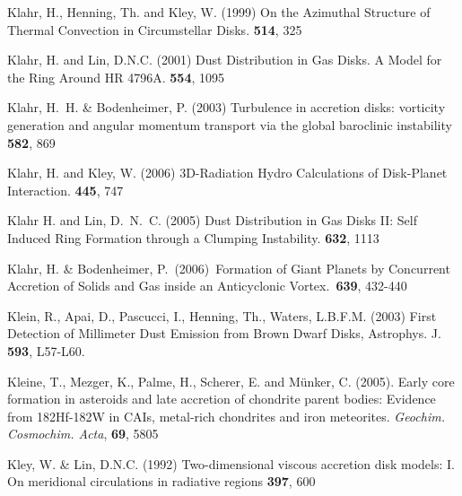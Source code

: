 \begin{literature}
\item
Klahr, H., Henning, Th. and Kley, W. (1999) On the Azimuthal Structure of
Thermal Convection in Circumstellar Disks. \apj \textbf{514}, 325

\item
Klahr, H. and Lin, D.N.C. (2001) Dust Distribution in Gas Disks. A Model for
the Ring Around HR 4796A. \apj \textbf{554}, 1095

\item
Klahr, H.~H. \& Bodenheimer, P. (2003)  Turbulence in accretion disks:
vorticity generation and angular momentum transport via the global
baroclinic instability  \apj \textbf{582}, 869

\item
Klahr, H. and Kley, W. (2006) 3D-Radiation Hydro Calculations of Disk-Planet
Interaction. \aap \textbf{445}, 747

\item
Klahr H. and Lin, D.~N.~C. (2005) Dust Distribution in Gas Disks II: Self 
Induced Ring Formation through a Clumping Instability. \apj \textbf{632},
1113

\item Klahr, H. \& Bodenheimer, P.\ (2006)\ 
Formation of Giant Planets by Concurrent Accretion of Solids and Gas inside
an Anticyclonic Vortex.\ \apj \textbf{639}, 432-440

\item 
Klein, R., Apai, D., Pascucci, I., Henning, Th., Waters,
L.B.F.M. (2003) First Detection of Millimeter Dust Emission from Brown
Dwarf Disks, Astrophys. J. \textbf{593}, L57-L60.


\item 
Kleine, T., Mezger, K., Palme, H., Scherer, E. and M\"unker, C.
(2005).  Early core formation in asteroids and late accretion of
chondrite parent bodies: Evidence from 182Hf-182W in CAIs, metal-rich
chondrites and iron meteorites.  \textit{Geochim. Cosmochim. Acta},
\textbf{69}, 5805


\item
Kley, W. \& Lin, D.N.C. (1992)  Two-dimensional viscous accretion disk models:
 I. On meridional circulations in radiative regions  \aap \textbf{397}, 600


\end{literature}

